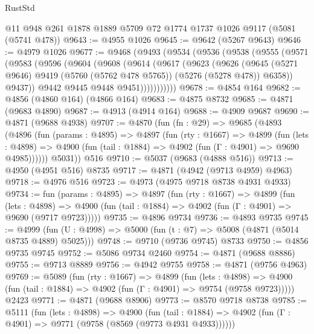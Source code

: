 \begin{lexlean}{RustStd}
\begin{coremodule}
{\begin{coremodule}
{{{{{{{{{{{{{{{{{{{{{{{{{{{{{    @11
    @948
    @261
    @1878
    @1889
    @5709
    @72
    @1774
    @1737
    @1026
    @9117
    (@5081 (@5741 @478))
@9643 := @4955 @1026
@9645 := @9642 (@5267 @9643)
@9646 := @4979 @1026
@9677 := @9468
    (@9493
      (@9534
        (@9536
          (@9538
            (@9555
              (@9571
                (@9583
                  (@9596
                    (@9604
                      (@9608
                        (@9614
                          (@9617
                            (@9623
                              (@9626
                                (@9645
                                  (@5271 @9646)
                                  @9419
                                  (@5760 (@5762 @478 @5765))
                                  (@5276 (@5278 @478))
                                  @6358))
                              @9437))
                          @9442
                          @9445
                          @9448
                          @9451)))))))))))
@9678 := @4854 @164
@9682 := @4856 (@4860 @164) (@4866 @164)
@9683 := @4875 @8732
@9685 := @4871 (@9683 @4890)
@9687 := @4913 (@4914 @164)
@9688 := @4909 @9687
@9690 := @4871 (@9688 @4938)
@9707 := @4870
    (fun (fn : @29) =>
    @9685
      (@4893
        (@4896
          (fun (params : @4895) =>
          @4897
            (fun (rty : @1667) =>
            @4899
              (fun (lets : @4898) =>
              @4900 (fun (tail : @1884) => @4902 (fun (Γ : @4901) => @9690 @4985))))))
        @5031))
    @516
@9710 := @5037 (@9683 (@4888 @516))
@9713 := @4950 (@4951 @516) @8735
@9717 := @4871 (@4942 (@9713 @4959) @4963)
@9718 := @4976 @516
@9723 := @4973 (@4975 @9718 @8738 @4931 @4933)
@9734 := fun (params : @4895) =>
  @4897
    (fun (rty : @1667) =>
    @4899
      (fun (lets : @4898) =>
      @4900 (fun (tail : @1884) => @4902 (fun (Γ : @4901) => @9690 (@9717 @9723)))))
@9735 := @4896 @9734
@9736 := @4893 @9735
@9745 := @4999 (fun (U : @4998) => @5000 (fun (t : @7) => @5008 (@4871 (@5014 @8735 @4889) @5025)))
@9748 := @9710 (@9736 @9745) @8733
@9750 := @4856 @9735 @9745
@9752 := @5086 @9734 @2460
@9754 := @4871 (@9688 @8886)
@9755 := @9713 @8889
@9756 := @4942 @9755
@9758 := @4871 (@9756 @4963)
@9769 := @5089
    (fun (rty : @1667) =>
    @4899
      (fun (lets : @4898) =>
      @4900 (fun (tail : @1884) => @4902 (fun (Γ : @4901) => @9754 (@9758 @9723)))))
    @2423
@9771 := @4871 (@9688 @8906)
@9773 := @8570 @9718 @8738
@9785 := @5111
    (fun (lets : @4898) =>
    @4900
      (fun (tail : @1884) => @4902 (fun (Γ : @4901) => @9771 (@9758 (@8569 (@9773 @4931 @4933))))))
}}}}}}}}}}}}}}}}}}}}}}}}}}}}}
\end{coremodule}}
\end{coremodule}
\end{lexlean}
